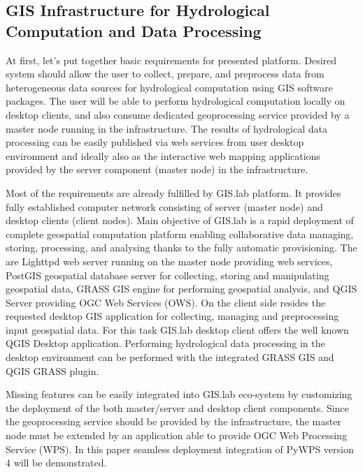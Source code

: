 \documentclass{isprs}
\begin{document}
\subsection{GIS Infrastructure for Hydrological Computation and
  Data Processing}\label{GIS Infrastructure for Hydrological Computation and
  Data Processing}

At first, let's put together basic requirements for presented
platform. Desired system should allow the user to collect, prepare,
and preprocess data from heterogeneous data sources for hydrological
computation using GIS software packages. The user will be able to
perform hydrological computation locally on desktop clients, and also
consume dedicated geoprocessing service provided by a master node
running in the infrastructure. The results of hydrological data
processing can be easily published via web services from user desktop
environment and ideally also as the interactive web mapping
applications provided by the server component (master node) in the
infrastructure.

Most of the requirements are already fulfilled by GIS.lab platform. It
provides fully established computer network consisting of server
(master node) and desktop clients (client nodes). Main objective of
GIS.lab is a rapid deployment of complete geospatial computation
platform enabling collaborative data managing, storing, processing,
and analysing thanks to the fully automatic provisioning. The are
Lighttpd web server running on the master node providing web services,
PostGIS geospatial database server for collecting, storing and
manipulating geospatial data, GRASS GIS engine for performing
geospatial analysis, and QGIS Server providing OGC Web Services
(OWS). On the client side resides the requested desktop GIS
application for collecting, managing and preprocessing input
geospatial data. For this task GIS.lab desktop client offers the well
known QGIS Desktop application. Performing hydrological data
processing in the desktop environment can be performed with the
integrated GRASS GIS and QGIS GRASS plugin.

Missing features can be easily integrated into GIS.lab eco-system by
customizing the deployment of the both master/server and desktop
client components. Since the geoprocessing service should be provided
by the infrastructure, the master node must be extended by an
application able to provide OGC Web Processing Service (WPS). In this
paper seamless deployment integration of PyWPS version 4 will be
demonstrated.
\end{document}
